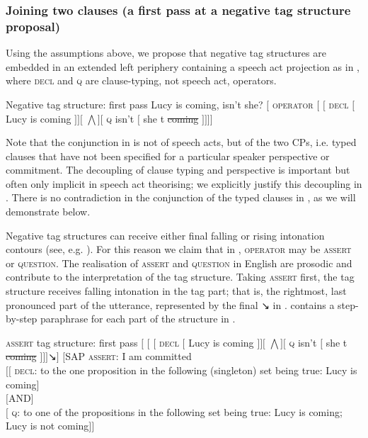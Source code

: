 \documentclass[output=paper,colorlinks,citecolor=brown]{langscibook}
\begin{document}
\subsubsection{Joining two clauses (a first pass at a negative tag structure proposal)}\label{sect:negtagpass1}

Using the assumptions above, we propose that negative tag structures are embedded in an extended left periphery containing a speech act projection as in , where \textsc{decl} and \textsc{q} are clause-typing, not speech act, operators.

\ea Negative tag structure: first pass\label{negtag:pass1}
\ea Lucy is coming, isn't she?
\ex $[$ \textsc{operator} $[$ $[$ \textsc{decl} $[$ Lucy is coming $]] [$ $\bigwedge ] [$ \textsc{q} isn't $[$ she t \sout{coming} $]]]]$\label{negtag1:b}
\z\z

Note that the conjunction in  is not of speech acts, but of the two CPs, i.e. typed clauses that have not been specified for a particular speaker perspective or commitment. The decoupling of clause typing and perspective is important but often only implicit in speech act theorising; we explicitly justify this decoupling in .  There is no contradiction in the conjunction of the typed clauses in , as we will demonstrate below.

Negative tag structures can receive either final falling or rising intonation contours (see, e.g. \citealt{dehebraun2013}). For this reason we claim that in , \textsc{operator} may be \textsc{assert} or \textsc{question}. The realisation of \textsc{assert} and \textsc{question} in English are prosodic and contribute to the interpretation of the tag structure. Taking \textsc{assert} first, the tag structure receives falling intonation in the tag part; that is, the rightmost, last pronounced part of the utterance, represented by the final ↘ in .  contains a step-by-step paraphrase for each part of the structure in .

\ea \textsc{assert} tag structure: first pass\label{asserttag:pass1}
\ea	$[$ $[$ $[$ \textsc{decl} $[$ Lucy is coming $]] [$ $\bigwedge ] [$ \textsc{q} isn't $[$ she t \sout{coming} $]]]$↘$]$\label{asserttag1:b}
\ex	$[$SAP \textsc{assert}: I am committed\\ 
 \phantom{-SAP-}$[[$ \textsc{decl}: to the one proposition in the following (singleton) set being true: Lucy is coming]\\
 \phantom{-SAP-}$[$AND$]$\\
 \phantom{-SAP-}$[$ \textsc{q}: to one of the propositions in the following set being true: Lucy is 
 	 	coming; Lucy is not coming$]]$\label{asserttag1:c}
    \z\z
\end{document}
